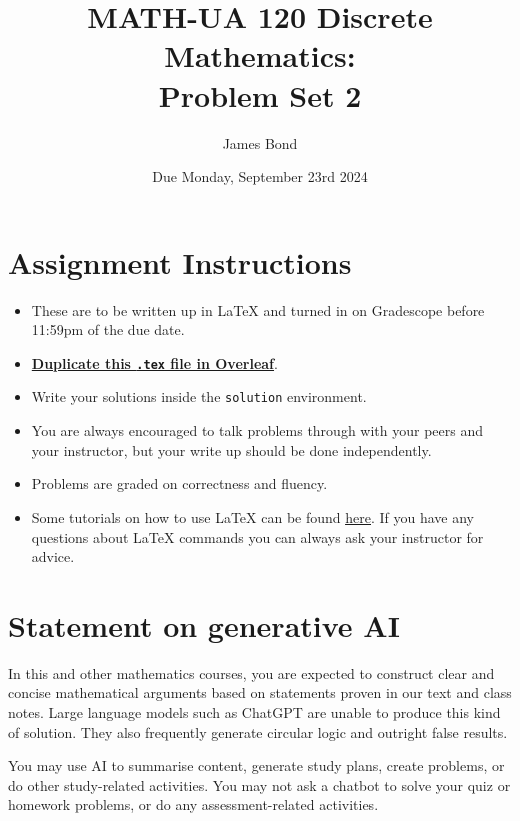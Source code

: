 \documentclass{article}
\title{\textbf{MATH-UA 120 Discrete Mathematics: \\ Problem Set 2}}
\author{%
    James Bond %
}
\date{Due Monday, September 23rd 2024} %
\theoremstyle{definition}
\begin{document}
\maketitle %

\vfill

\section*{Assignment Instructions}

\begin{itemize}
    \item These are to be written up in \LaTeX{} and turned in on Gradescope before 11:59pm of the due date.
    \item \href{https://bit.ly/3XfKMtA}{\textbf{Duplicate this \texttt{.tex} file in Overleaf}}.
    \item Write your solutions inside the \texttt{solution} environment.
    \item You are always encouraged to talk problems through with your peers and your instructor, but your write up should be done independently.
    \item Problems are graded on correctness and fluency.
    \item Some tutorials on how to use \LaTeX{} can be found \href{https://www.overleaf.com/learn/latex/Tutorials}{\underline{here}}. If you have any questions about \LaTeX{} commands you can always ask your instructor for advice.
\end{itemize}

\vfill

\section*{Statement on generative AI}

In this and other mathematics courses, you are expected to construct clear and concise mathematical arguments based on statements proven in our text and class notes. Large language models such as ChatGPT are unable to produce this kind of solution. They also frequently generate circular logic and outright false results.
 
You may use AI to summarise content, generate study plans, create problems, or do other study-related activities. You may not ask a chatbot to solve your quiz or homework problems, or do any assessment-related activities.
 
\end{document}
